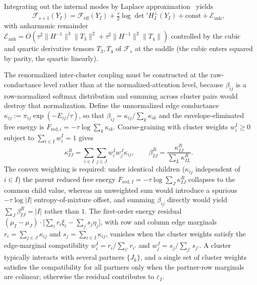 \documentclass[11pt]{article}
\begin{document}
Integrating out the internal modes by Laplace approximation~\cite{Cardy1996} yields
\begin{equation}
\mathcal{F}_{s+1}(Y_I) = \mathcal{F}_{\mathrm{eff}}(Y_I) + \tfrac{\tau}{2}\log\det{}'H_I^\perp(Y_I) + \mathrm{const} + \mathcal{E}_{\mathrm{anh}},
\label{eq:rg_laplace}
\end{equation}
with anharmonic remainder $\mathcal{E}_{\mathrm{anh}} = O(\tau^2 \|H^{-1}\|^3 \|T_3\|^2 + \tau^2 \|H^{-1}\|^2 \|T_4\|)$ controlled by the cubic and quartic derivative tensors $T_3, T_4$ of $\mathcal{F}_s$ at the saddle (the cubic enters squared by parity, the quartic linearly).

The renormalized inter-cluster coupling must be constructed at the raw-conductance level rather than at the normalized-attention level, because $\beta_{ij}$ is a row-normalized softmax distribution and summing across cluster pairs would destroy that normalization. Define the unnormalized edge conductance $\kappa_{ij} := \pi_{ij}\exp(-E_{ij}/\tau)$, so that $\beta_{ij} = \kappa_{ij}/\sum_k \kappa_{ik}$ and the envelope-eliminated free energy is $F_{\mathrm{red},i} = -\tau \log \sum_k \kappa_{ik}$. Coarse-graining with cluster weights $w_i^I \ge 0$ subject to $\sum_{i \in I} w_i^I = 1$ gives
\begin{equation}
\kappa_{IJ}^R = \sum_{i \in I}\sum_{j \in J} w_i^I w_j^J \kappa_{ij}, \qquad \beta_{IJ}^R = \frac{\kappa_{IJ}^R}{\sum_L \kappa_{IL}^R}.
\label{eq:rg_inter_cluster}
\end{equation}
The convex weighting is required: under identical children ($\kappa_{ij}$ independent of $i \in I$) the parent reduced free energy $F_{\mathrm{red},I} = -\tau \log \sum_J \kappa_{IJ}^R$ collapses to the common child value, whereas an unweighted sum would introduce a spurious $-\tau \log |I|$ entropy-of-mixture offset, and summing $\beta_{ij}$ directly would yield $\sum_J \beta_{IJ}^R = |I|$ rather than $1$. The first-order energy residual $(\mu_I - \mu_J) \cdot \big[\sum_i r_i \xi_i - \sum_j s_j \eta_j\big]$, with row and column edge marginals $r_i = \sum_{j \in J} \kappa_{ij}$ and $s_j = \sum_{i \in I} \kappa_{ij}$, vanishes when the cluster weights satisfy the edge-marginal compatibility $w_i^I = r_i/\sum_{i'} r_{i'}$ and $w_j^J = s_j/\sum_{j'} s_{j'}$. A cluster typically interacts with several partners $\{J_k\}$, and a single set of cluster weights satisfies the compatibility for all partners only when the partner-row marginals are colinear; otherwise the residual contributes to $\varepsilon_I$.
\end{document}
